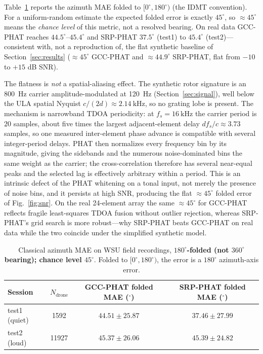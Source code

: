 \documentclass[sensors,article,submit,pdftex,moreauthors]{Definitions/mdpi}
\begin{document}
Table~\ref{tab:wsu_mae} reports the azimuth MAE folded to $[0^\circ,180^\circ)$ (the IDMT convention). For a uniform-random estimate the expected folded error is exactly $45^\circ$, so $\approx45^\circ$ means the \emph{chance level} of this metric, not a resolved bearing. On real data GCC-PHAT reaches $44.5^\circ$--$45.4^\circ$ and SRP-PHAT $37.5^\circ$ (test1) to $45.4^\circ$ (test2)---consistent with, not a reproduction of, the flat synthetic baseline of Section~\ref{sec:results} ($\approx45^\circ$ GCC-PHAT and $\approx44.9^\circ$ SRP-PHAT, flat from $-10$ to $+15$ dB SNR).

The flatness is \emph{not} a spatial-aliasing effect. The synthetic rotor signature is an \SI{800}{\hertz} carrier amplitude-modulated at \SI{120}{\hertz} (Section~\ref{sec:signal}), well below the ULA spatial Nyquist $c/(2d)\approx\SI{2.14}{\kHz}$, so no grating lobe is present. The mechanism is narrowband TDOA periodicity: at $f_s=\SI{16}{\kilo\hertz}$ the carrier period is $20$ samples, about five times the largest adjacent-element delay $df_s/c\approx3.73$ samples, so one measured inter-element phase advance is compatible with several integer-period delays. PHAT then normalizes every frequency bin by its magnitude, giving the sidebands and the numerous noise-dominated bins the same weight as the carrier; the cross-correlation therefore has several near-equal peaks and the selected lag is effectively arbitrary within a period. This is an intrinsic defect of the PHAT whitening on a tonal input, not merely the presence of noise bins, and it persists at high SNR, producing the flat $\approx45^\circ$ folded error of Fig.~\ref{fig:snr}. On the real \num{24}-element array the same $\approx45^\circ$ for GCC-PHAT reflects fragile least-squares TDOA fusion without outlier rejection, whereas SRP-PHAT's grid search is more robust---why SRP-PHAT beats GCC-PHAT on real data while the two coincide under the simplified synthetic model.
\begin{table}[H]
\centering
\caption{Classical azimuth MAE on WSU field recordings, \textbf{$180^\circ$-folded (not $360^\circ$ bearing); chance level $45^\circ$}. Folded to $[0^\circ,180^\circ)$, the error is a $180^\circ$ azimuth-axis error.}
\label{tab:wsu_mae}
\begin{tabular}{lccc}
\toprule
Session & $N_{\text{drone}}$ & GCC-PHAT folded MAE ($^\circ$) & SRP-PHAT folded MAE ($^\circ$) \\
\midrule
test1 (quiet) & \num{1592} & $44.51\pm25.87$ & $37.46\pm27.99$ \\
test2 (loud) & \num{11927} & $45.37\pm26.06$ & $45.39\pm24.82$ \\
\bottomrule
\end{tabular}
\end{table}
\end{document}
